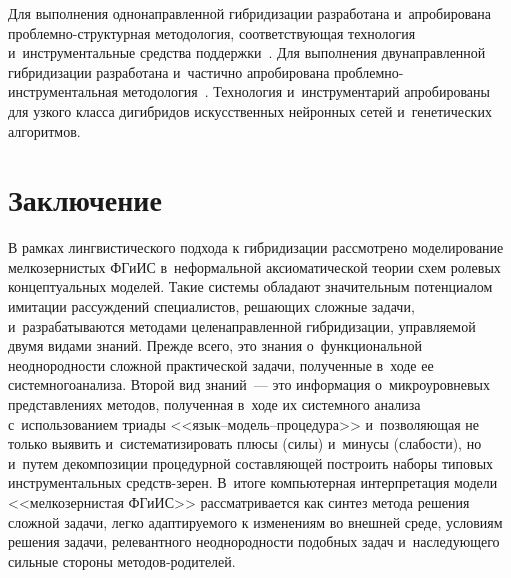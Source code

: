 \begin{multicols}{2}
  Для выполнения однонаправленной гибридизации разработана и~апробирована  
проб\-лем\-но-струк\-тур\-ная методология, соответствующая технология 
и~инструментальные средства поддержки~\cite{6-kir, 8-kir}. Для выполнения 
двунаправленной гибридизации разработана и~частично апробирована  
проб\-лем\-но-ин\-ст\-ру\-мен\-таль\-ная методология~\cite{12-kir}. Технология 
и~инструментарий апробированы для узкого класса дигибридов искусственных нейронных 
сетей и~генетических алгоритмов.

\vspace*{-9pt}

\section{Заключение}

  В рамках лингвистического подхода к гибридизации рассмотрено моделирование 
мелкозернистых ФГиИС в~неформальной 
аксиоматической тео\-рии схем ролевых концептуальных моделей. Такие системы обладают 
значительным потенциалом имитации рассуждений специалистов, решающих сложные 
задачи, и~разрабатываются методами целенаправленной гибридизации, управляемой двумя 
видами знаний. Прежде всего, это знания о~функциональной неоднородности сложной 
практической задачи, полученные в~ходе ее системного\linebreak анализа. Второй вид знаний~--- это 
информация о~микроуровневых представлениях методов, полученная в~ходе их системного 
анализа с~использованием триады <<язык--мо\-дель--про\-це\-ду\-ра>> и~позволяющая не 
только выявить и~систематизировать плюсы (силы) и~минусы (слабости), но и~путем 
декомпозиции процедурной составляющей построить наборы типовых инструментальных 
средств-зе\-рен. В~итоге компьютерная интерпретация модели\linebreak
 <<мелкозернистая 
ФГиИС>> рассматривается как синтез метода решения сложной задачи, легко 
адап\-тируемого к изменениям во внешней среде, условиям решения задачи, релевантного 
неоднородности подобных задач и~наследующего сильные стороны  
ме\-то\-дов-ро\-ди\-те\-лей.

\vspace*{-6pt}
  

\end{multicols}
